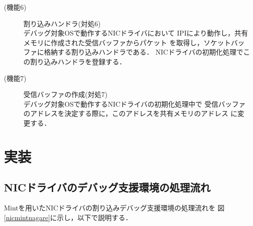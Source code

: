 \documentclass[submit,techreq,noauthor,dvipdfmx]{ipsj}
\begin{document}
\begin{enumerate}
\begin{description}
            \item[(機能6)] 割り込みハンドラ(対処6)\\
                デバッグ対象OSで動作するNICドライバにおいて
                IPIにより動作し，共有メモリに作成された受信バッファからパケット
                を取得し，ソケットバッファに格納する割り込みハンドラである．
                NICドライバの初期化処理でこの割り込みハンドラを登録する．
            \item[(機能7)] 受信バッファの作成(対処7)\\
                デバッグ対象OSで動作するNICドライバの初期化処理中で
                受信バッファのアドレスを決定する際に，このアドレスを共有メモリのアドレス
                に変更する．
        \end{description}
\end{enumerate}

\section{実装}\label{chap:implemantation}

\subsection{NICドライバのデバッグ支援環境の処理流れ}\label{sec:processing_flow_of_DSM_of_NICdriver}


Mintを用いたNICドライバの割り込みデバッグ支援環境の処理流れを
図\ref{nicmintnagare}に示し，以下で説明する．
\end{document}
